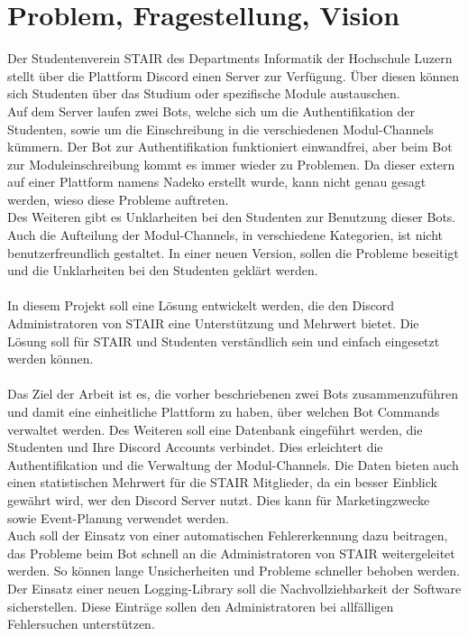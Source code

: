\documentclass[a4paper, table]{article}
\begin{document}

\newpage
\tableofcontents

\newpage

\section{Problem, Fragestellung, Vision}
Der Studentenverein STAIR des Departments Informatik der Hochschule Luzern stellt über die Plattform Discord einen Server zur Verfügung.
Über diesen können sich Studenten über das Studium oder spezifische Module austauschen.\\
Auf dem Server laufen zwei Bots, welche sich um die Authentifikation der Studenten, sowie um die Einschreibung in die verschiedenen Modul-Channels kümmern.
Der Bot zur Authentifikation funktioniert einwandfrei, aber beim Bot zur Moduleinschreibung kommt es immer wieder zu Problemen.
Da dieser extern auf einer Plattform namens Nadeko erstellt wurde, kann nicht genau gesagt werden, wieso diese Probleme auftreten.\\
Des Weiteren gibt es Unklarheiten bei den Studenten zur Benutzung dieser Bots.
Auch die Aufteilung der Modul-Channels, in verschiedene Kategorien, ist nicht benutzerfreundlich gestaltet.
In einer neuen Version, sollen die Probleme beseitigt und die Unklarheiten bei den Studenten geklärt werden.\\\\
In diesem Projekt soll eine Lösung entwickelt werden, die den Discord Administratoren von STAIR eine Unterstützung und Mehrwert bietet.
Die Lösung soll für STAIR und Studenten verständlich sein und einfach eingesetzt werden können.\\\\
Das Ziel der Arbeit ist es, die vorher beschriebenen zwei Bots zusammenzuführen und damit eine einheitliche Plattform zu haben, über welchen Bot Commands verwaltet werden.
Des Weiteren soll eine Datenbank eingeführt werden, die Studenten und Ihre Discord Accounts verbindet.
Dies erleichtert die Authentifikation und die Verwaltung der Modul-Channels.
Die Daten bieten auch einen statistischen Mehrwert für die STAIR Mitglieder, da ein besser Einblick gewährt wird, wer den Discord Server nutzt.
Dies kann für Marketingzwecke sowie Event-Planung verwendet werden.\\
Auch soll der Einsatz von einer automatischen Fehlererkennung dazu beitragen, das Probleme beim Bot schnell an die Administratoren von STAIR weitergeleitet werden.
So können lange Unsicherheiten und Probleme schneller behoben werden.
Der Einsatz einer neuen Logging-Library soll die Nachvollziehbarkeit der Software sicherstellen.
Diese Einträge sollen den Administratoren bei allfälligen Fehlersuchen unterstützen.\\\\ 
\end{document}
